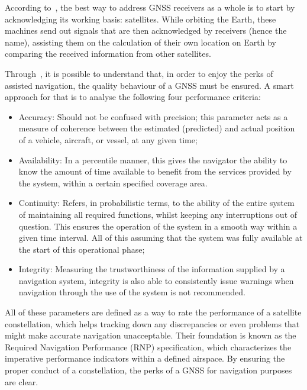 According to~\cite{novatel_gnss}, the best way to address GNSS receivers as a whole is to start by acknowledging its working basis: satellites. While orbiting the Earth, these machines send out signals that are then acknowledged by receivers (hence the name), assisting them on the calculation of their own location on Earth by comparing the received information from other satellites.

Through~\cite{fed_rad_plan_2008}, it is possible to understand that, in order to enjoy the perks of assisted navigation, the quality behaviour of a GNSS must be ensured. 
A smart approach for that is to analyse the following four performance criteria:

\begin{itemize}
    \item Accuracy: Should not be confused with precision; this parameter acts as a measure of coherence between the estimated (predicted) and actual position of a vehicle, aircraft, or vessel, at any given time;
    \item Availability: In a percentile manner, this gives the navigator the ability to know the amount of time available to benefit from the services provided by the system, within a certain specified coverage area.
    \item Continuity: Refers, in probabilistic terms, to the ability of the entire system of maintaining all required functions, whilst keeping any interruptions out of question. This ensures the operation of the system in a smooth way within a given time interval. All of this assuming that the system was fully available at the start of this operational phase;
    \item Integrity: Measuring the trustworthiness of the information supplied by a navigation system, integrity is also able to consistently issue warnings when navigation through the use of the system is not recommended.
\end{itemize}
All of these parameters are defined as a way to rate the performance of a satellite constellation, which helps tracking down any discrepancies or even problems that might make accurate navigation unacceptable.
Their foundation is known as the Required Navigation Performance (RNP) specification, which characterizes the imperative performance indicators within a defined airspace. By ensuring the proper conduct of a constellation, the perks of a GNSS for navigation purposes are clear.

